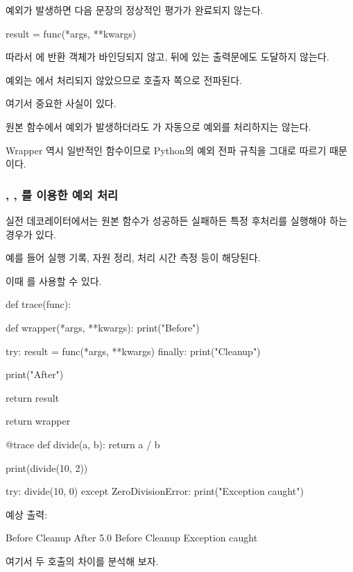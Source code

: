 예외가 발생하면 다음 문장의 정상적인 평가가 완료되지 않는다.

\begin{dhkcode}
result = func(*args, **kwargs)
\end{dhkcode}

따라서 에 반환 객체가 바인딩되지 않고, 뒤에 있는  출력문에도 도달하지 않는다.

예외는 에서 처리되지 않았으므로 호출자 쪽으로 전파된다.

여기서 중요한 사실이 있다.

원본 함수에서 예외가 발생하더라도 가 자동으로 예외를 처리하지는 않는다.

Wrapper 역시 일반적인 함수이므로 Python의 예외 전파 규칙을 그대로 따르기 때문이다.

\subsubsection{, , 를 이용한 예외 처리}

실전 데코레이터에서는 원본 함수가 성공하든 실패하든 특정 후처리를 실행해야 하는 경우가 있다.

예를 들어 실행 기록, 자원 정리, 처리 시간 측정 등이 해당된다.

이때 를 사용할 수 있다.

\begin{dhkcode}
def trace(func):

    def wrapper(*args, **kwargs):
        print("Before")

        try:
            result = func(*args, **kwargs)
        finally:
            print("Cleanup")

        print("After")

        return result

    return wrapper


@trace
def divide(a, b):
    return a / b


print(divide(10, 2))

try:
    divide(10, 0)
except ZeroDivisionError:
    print("Exception caught")
\end{dhkcode}

예상 출력:

\begin{dhkzsh}
Before
Cleanup
After
5.0
Before
Cleanup
Exception caught
\end{dhkzsh}

여기서 두 호출의 차이를 분석해 보자.

